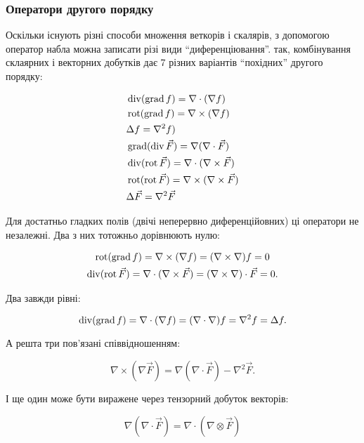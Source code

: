 \subsubsection{Оператори другого порядку}

Оскільки існують різні способи множення веткорів і скалярів, з допомогою оператор набла можна записати різі види ``диференціювання''. так, комбінування склаярних і векторних добутків дає 7 різних варіантів ``похідних'' другого порядку:

\begin{align}
	& \operatorname{div} (\operatorname{grad} f) = \nabla \cdot (\nabla f) \\
	& \operatorname{rot} (\operatorname{grad} f) = \nabla \times (\nabla f) \\
	& \Delta f = \nabla^2 f) \\
	& \operatorname{grad} (\operatorname{div} \vec{F}) = \nabla (\nabla \cdot \vec{F}) \\
	& \operatorname{div} (\operatorname{rot} \vec{F}) = \nabla \cdot (\nabla \times \vec{F}) \\
	& \operatorname{rot} (\operatorname{rot} \vec{F}) = \nabla \times (\nabla \times \vec{F}) \\
	& \Delta \vec{F} = \nabla^2 \vec{F}
\end{align}

Для достатньо гладких полів (двічі неперервно диференційовних) ці оператори не незалежні. Два з них тотожньо дорівнюють нулю:

\begin{gather}
	\operatorname{rot} (\operatorname{grad} f) = \nabla \times (\nabla f) = (\nabla \times \nabla) f = 0 \\
	\operatorname{div} (\operatorname{rot} \vec{F}) = \nabla \cdot (\nabla \times \vec{F}) = (\nabla \times \nabla) \cdot \vec{F} = 0.
\end{gather}

Два завжди рівні:

\begin{equation}
	\operatorname{div} (\operatorname{grad} f) = \nabla \cdot (\nabla f) = (\nabla \cdot \nabla) f = \nabla^2 f = \Delta f.
\end{equation}

А решта три пов'язані співвідношенням:

\begin{equation}
	\nabla \times (\nabla \vec {F})= \nabla (\nabla \cdot \vec{F}) - \nabla^2 \vec{F}.
\end{equation}

І ще один може бути виражене через тензорний добуток векторів:

\begin{equation}
	\nabla (\nabla \cdot \vec{F}) = \nabla \cdot (\nabla \otimes \vec {F})
\end{equation}

